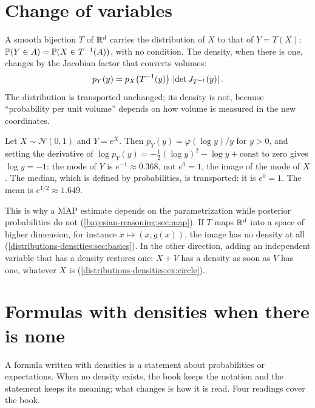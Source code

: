 \begin{notechapter}
\section{Change of variables}\label{distributions-densities:sec:change}

A smooth bijection $T$ of $\mathbb{R}^d$ carries the distribution of $X$ to that of $Y = T(X)$:
$\mathbb{P}(Y\in A) = \mathbb{P}(X\in T^{-1}(A))$, with no condition. The density, when there is one, changes by the
Jacobian factor that converts volumes:
\[
  p_Y(y) = p_X\bigl(T^{-1}(y)\bigr)\,\left|\det J_{T^{-1}}(y)\right| .
\]
The distribution is transported unchanged; its density is not, because ``probability per unit volume''
depends on how volume is measured in the new coordinates.

\begin{example}\label{distributions-densities:ex:lognormal}
Let $X\sim\mathcal N(0, 1)$ and $Y = e^X$. Then $p_Y(y) = \varphi(\log y)/y$ for $y > 0$, and setting the
derivative of $\log p_Y(y) = -\frac12(\log y)^2 - \log y + \text{const}$ to zero gives $\log y = -1$: the mode of
$Y$ is $e^{-1}\approx0.368$, not $e^0 = 1$, the image of the mode of $X$. The median, which is defined by
probabilities, is transported: it is $e^0 = 1$. The mean is $e^{1/2}\approx1.649$.
\end{example}

This is why a MAP estimate depends on the parametrization while posterior probabilities do not
(\cref{bayesian-reasoning:sec:map}). If $T$ maps $\mathbb{R}^d$ into a space of higher dimension, for instance
$x\mapsto(x, g(x))$, the image has no density at all (\cref{distributions-densities:sec:basics}). In the other
direction, adding an independent variable that has a density restores one: $X + V$ has a density as soon as
$V$ has one, whatever $X$ is (\cref{distributions-densities:ex:circle}).

\section{Formulas with densities when there is none}\label{distributions-densities:sec:notation}

A formula written with densities is a statement about probabilities or expectations. When no density
exists, the book keeps the notation and the statement keeps its meaning; what changes is how it is
read. Four readings cover the book.


\end{notechapter}

